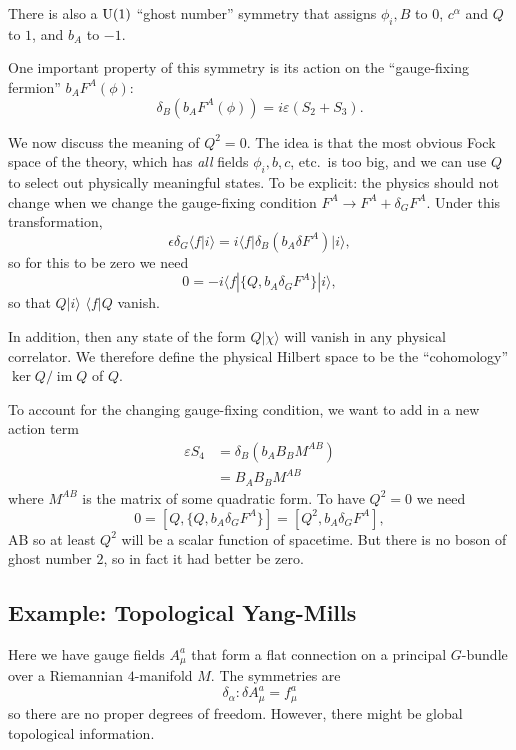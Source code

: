 There is also a $\operatorname{U}(1)$ ``ghost number'' symmetry that assigns $\phi_i,B$ to $0$, $c^\alpha$ and $Q$ to $1$, and $b_A$ to $-1$. 

One important property of this symmetry is its action on the ``gauge-fixing fermion'' $b_A F^A(\phi)$:
\[
\delta_B(b_A F^A(\phi)) = i \varepsilon(S_2 + S_3).
\]

We now discuss the meaning of $Q^2 = 0$.
The idea is that the most obvious Fock space of the theory, which has \emph{all} fields $\phi_i, b, c$, etc.~is too big, and we can use $Q$ to select out physically meaningful states.
To be explicit: the physics should not change when we change the gauge-fixing condition $F^A \to F^A + \delta_G F^A$.
Under this transformation,
\[
\epsilon \delta_G \langle f | i \rangle = i \langle f| \delta_B(b_A \delta F^A) | i \rangle,
\]
so for this to be zero we need
\[
0 = -i \langle f | \{Q, b_A \delta_G F^A\} |i\rangle,
\]
so that $Q|i\rangle$  $\langle f | Q$ vanish.

In addition, then any state of the form $Q|\chi \rangle$ will vanish in any physical correlator.
We therefore define the physical Hilbert space to be the ``cohomology'' $\ker Q / \operatorname{im} Q$ of $Q$.


To account for the changing gauge-fixing condition, we want to add in a new action term
\begin{align*}
\varepsilon S_4 &= \delta_B( b_A B_B M^{AB})\\
&= B_A B_B M^{AB}
\end{align*}
where $M^{AB}$ is the matrix of some quadratic form.
To have $Q^2 = 0$ we need
\[
0 = [Q, \{Q, b_A \delta_G F^A\} ] = [Q^2, b_A \delta_G F^A],
\]AB
so at least $Q^2$ will be a scalar function of spacetime.
But there is no boson of ghost number $2$, so in fact it had better be zero.

\subsection*{Example: Topological Yang-Mills}
Here we have gauge fields $A_\mu^a$ that form a flat connection on a principal $G$-bundle over a Riemannian $4$-manifold $M$.
The symmetries are
\[
\delta_\alpha : \delta A_\mu^a = f_\mu^a
\]
so there are no proper degrees of freedom.
However, there might be global topological information.

